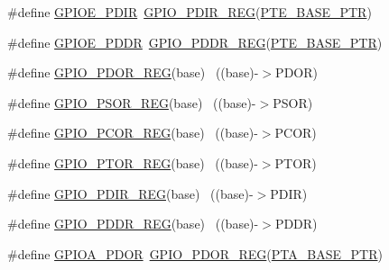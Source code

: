\begin{DoxyCompactItemize}
\item 
\#define \hyperlink{group___g_p_i_o___register___accessor___macros_gab12c5a1580446153a220ff5fadf052bd}{G\+P\+I\+O\+E\+\_\+\+P\+D\+IR}~\hyperlink{group___g_p_i_o___register___accessor___macros_gac2c9f15f5083562b4f7c2826afe2d2b6}{G\+P\+I\+O\+\_\+\+P\+D\+I\+R\+\_\+\+R\+EG}(\hyperlink{group___g_p_i_o___peripheral_gaa230685f72ad1540850ab8d12366775c}{P\+T\+E\+\_\+\+B\+A\+S\+E\+\_\+\+P\+TR})
\item 
\#define \hyperlink{group___g_p_i_o___register___accessor___macros_ga4ca5e050e0a711260b6d4dd0d3eabe76}{G\+P\+I\+O\+E\+\_\+\+P\+D\+DR}~\hyperlink{group___g_p_i_o___register___accessor___macros_ga059c8153363c15c02fbf13c0de04298d}{G\+P\+I\+O\+\_\+\+P\+D\+D\+R\+\_\+\+R\+EG}(\hyperlink{group___g_p_i_o___peripheral_gaa230685f72ad1540850ab8d12366775c}{P\+T\+E\+\_\+\+B\+A\+S\+E\+\_\+\+P\+TR})
\item 
\#define \hyperlink{group___g_p_i_o___register___accessor___macros_ga737b4580bb16c01a468bc2c129e54d86}{G\+P\+I\+O\+\_\+\+P\+D\+O\+R\+\_\+\+R\+EG}(base)                                        ~((base)-\/$>$P\+D\+OR)
\item 
\#define \hyperlink{group___g_p_i_o___register___accessor___macros_ga05da33b22ee087558800c07d743c52e7}{G\+P\+I\+O\+\_\+\+P\+S\+O\+R\+\_\+\+R\+EG}(base)                                        ~((base)-\/$>$P\+S\+OR)
\item 
\#define \hyperlink{group___g_p_i_o___register___accessor___macros_gafeabd0beb942930229271934efc513ef}{G\+P\+I\+O\+\_\+\+P\+C\+O\+R\+\_\+\+R\+EG}(base)                                        ~((base)-\/$>$P\+C\+OR)
\item 
\#define \hyperlink{group___g_p_i_o___register___accessor___macros_ga4c1b943d4d92f73c9f08d272d8fc8fe1}{G\+P\+I\+O\+\_\+\+P\+T\+O\+R\+\_\+\+R\+EG}(base)                                        ~((base)-\/$>$P\+T\+OR)
\item 
\#define \hyperlink{group___g_p_i_o___register___accessor___macros_gac2c9f15f5083562b4f7c2826afe2d2b6}{G\+P\+I\+O\+\_\+\+P\+D\+I\+R\+\_\+\+R\+EG}(base)                                        ~((base)-\/$>$P\+D\+IR)
\item 
\#define \hyperlink{group___g_p_i_o___register___accessor___macros_ga059c8153363c15c02fbf13c0de04298d}{G\+P\+I\+O\+\_\+\+P\+D\+D\+R\+\_\+\+R\+EG}(base)                                        ~((base)-\/$>$P\+D\+DR)
\item 
\#define \hyperlink{group___g_p_i_o___register___accessor___macros_ga5c5a9a4e809579e68ae743d931312cc5}{G\+P\+I\+O\+A\+\_\+\+P\+D\+OR}~\hyperlink{group___g_p_i_o___register___accessor___macros_ga737b4580bb16c01a468bc2c129e54d86}{G\+P\+I\+O\+\_\+\+P\+D\+O\+R\+\_\+\+R\+EG}(\hyperlink{group___g_p_i_o___peripheral_gadf98f6ee2bbfd42102e378a66b29b9ef}{P\+T\+A\+\_\+\+B\+A\+S\+E\+\_\+\+P\+TR})

\end{DoxyCompactItemize}
